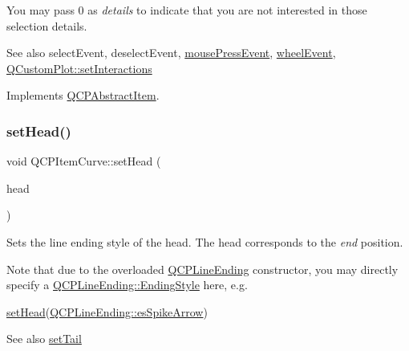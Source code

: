 You may pass 0 as {\itshape details} to indicate that you are not interested in those selection details.

\begin{DoxySeeAlso}{See also}
select\+Event, deselect\+Event, \hyperlink{class_q_c_p_layerable_af6567604818db90f4fd52822f8bc8376}{mouse\+Press\+Event}, \hyperlink{class_q_c_p_layerable_a47dfd7b8fd99c08ca54e09c362b6f022}{wheel\+Event}, \hyperlink{class_q_custom_plot_a5ee1e2f6ae27419deca53e75907c27e5}{Q\+Custom\+Plot\+::set\+Interactions} 
\end{DoxySeeAlso}


Implements \hyperlink{class_q_c_p_abstract_item_ae41d0349d68bb802c49104afd100ba2a}{Q\+C\+P\+Abstract\+Item}.

\mbox{\label{class_q_c_p_item_curve_a08a30d9cdd63995deea3d9e20430676f}} 
\subsubsection{\texorpdfstring{set\+Head()}{setHead()}}
{\footnotesize\ttfamily void Q\+C\+P\+Item\+Curve\+::set\+Head (\begin{DoxyParamCaption}\item[{const \hyperlink{class_q_c_p_line_ending}{Q\+C\+P\+Line\+Ending} \&}]{head }\end{DoxyParamCaption})}

Sets the line ending style of the head. The head corresponds to the {\itshape end} position.

Note that due to the overloaded \hyperlink{class_q_c_p_line_ending}{Q\+C\+P\+Line\+Ending} constructor, you may directly specify a \hyperlink{class_q_c_p_line_ending_a5ef16e6876b4b74959c7261d8d4c2cd5}{Q\+C\+P\+Line\+Ending\+::\+Ending\+Style} here, e.\+g.
\begin{DoxyCode}
\hyperlink{class_q_c_p_item_curve_a08a30d9cdd63995deea3d9e20430676f}{setHead}(\hyperlink{class_q_c_p_line_ending_a5ef16e6876b4b74959c7261d8d4c2cd5ab9964d0d03f812d1e79de15edbeb2cbf}{QCPLineEnding::esSpikeArrow}) 
\end{DoxyCode}


\begin{DoxySeeAlso}{See also}
\hyperlink{class_q_c_p_item_curve_ac3488d8b1a6489c845dc5bff3ef71124}{set\+Tail} 
\end{DoxySeeAlso}
\mbox{\label{class_q_c_p_item_curve_a034be908440aec785c34b92843461221}} 

